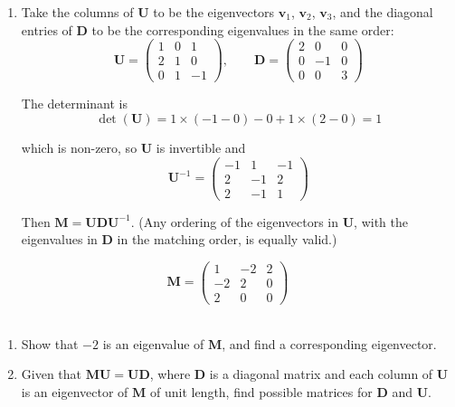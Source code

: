 \documentclass[leqno]{article}
\begin{document}
\begin{enumerate}[
  label=\textbf{\arabic*.},
  leftmargin=*,
  topsep=0pt,
  partopsep=0pt,
  parsep=0pt
]
\begin{djsSolution}
\begin{enumerate}[label=\textbf{(\alph*)}, start=1]
(or any non-zero multiple of this).

  \item Take the columns of \(\mathbf{U}\) to be the eigenvectors \(\mathbf{v}_1\), \(\mathbf{v}_2\), \(\mathbf{v}_3\), and the diagonal entries of \(\mathbf{D}\) to be the corresponding eigenvalues in the same order:
\[
\mathbf{U}=\begin{pmatrix} 1 & 0 & 1 \\ 2 & 1 & 0 \\ 0 & 1 & -1 \end{pmatrix},\qquad \mathbf{D}=\begin{pmatrix} 2 & 0 & 0 \\ 0 & -1 & 0 \\ 0 & 0 & 3 \end{pmatrix}
\]

The determinant is
\[
\det(\mathbf{U})=1\times(-1-0)-0+1\times(2-0)=1
\]

which is non-zero, so \(\mathbf{U}\) is invertible and
\[
\mathbf{U}^{-1}=\begin{pmatrix} -1 & 1 & -1 \\ 2 & -1 & 2 \\ 2 & -1 & 1 \end{pmatrix}
\]

Then \(\mathbf{M}=\mathbf{U}\mathbf{D}\mathbf{U}^{-1}\). (Any ordering of the eigenvectors in \(\mathbf{U}\), with the eigenvalues in \(\mathbf{D}\) in the matching order, is equally valid.)
\end{enumerate}
\end{djsSolution}

\newpage

\questionitem

\[\mathbf{M} = \begin{pmatrix} 1 & -2 & 2 \\ -2 & 2 & 0 \\ 2 & 0 & 0 \end{pmatrix}\] \\
\begin{enumerate}[label=\textbf{(\alph*)}]
  \item Show that $-2$ is an eigenvalue of $\mathbf{M}$, and find a corresponding eigenvector.  \\
  \item Given that $\mathbf{MU} = \mathbf{UD}$, where $\mathbf{D}$ is a diagonal matrix and each column of $\mathbf{U}$ is an eigenvector of $\mathbf{M}$ of unit length, find possible matrices for $\mathbf{D}$ and $\mathbf{U}$.  \\
\end{enumerate}


\end{enumerate}
\end{document}
